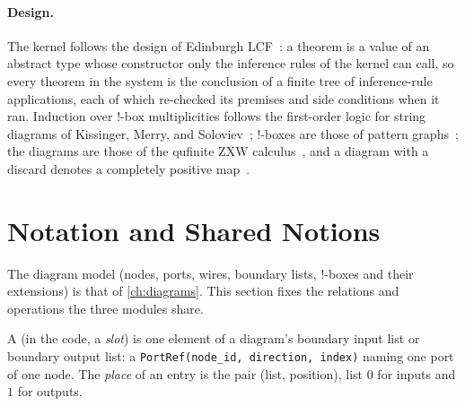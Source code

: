\paragraph{Design.} The kernel follows the design of Edinburgh LCF~\cite{gordon1979lcf}: a theorem is a value of an abstract type whose constructor only the inference rules of the kernel can call, so every theorem in the system is the conclusion of a finite tree of inference-rule applications, each of which re-checked its premises and side conditions when it ran. Induction over !-box multiplicities follows the first-order logic for string diagrams of Kissinger, Merry, and Soloviev~\cite{kissinger2015firstorder}; !-boxes are those of pattern graphs~\cite{dixon2009graphical,kissinger2014pattern}; the diagrams are those of the qufinite ZXW calculus~\cite{poor2023zxw,wang2023qufinitezxw}, and a diagram with a discard denotes a completely positive map~\cite{selinger2007cpm,carette2019mixed}.

\section{Notation and Shared Notions}\label{sec:kernel-notation}

The diagram model (nodes, ports, wires, boundary lists, !-boxes and their extensions) is that of \cref{ch:diagrams}. This section fixes the relations and operations the three modules share.

\begin{definition}\label{def:kernel-entry}
A  (in the code, a \emph{slot}) is one element of a diagram's boundary input list or boundary output list: a \texttt{PortRef(\allowbreak{}node\_\allowbreak{}id,\allowbreak{} direction,\allowbreak{} index)} naming one port of one node. The \emph{place} of an entry is the pair (list, position), list $0$ for inputs and $1$ for outputs.
\end{definition}

